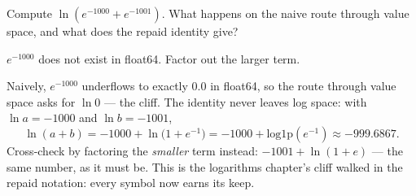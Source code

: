 \begin{problem}[stretch]
Compute $\ln(e^{-1000} + e^{-1001})$. What happens on the naive
route through value space, and what does the repaid identity give?
\begin{hint}
$e^{-1000}$ does not exist in float64. Factor out the larger term.
\end{hint}
\begin{solution}
Naively, $e^{-1000}$ underflows to exactly $0.0$ in float64, so the
route through value space asks for $\ln 0$ — the cliff. The identity
never leaves log space: with $\ln a = -1000$ and $\ln b = -1001$,
\[
  \ln(a+b) = -1000 + \ln\!\bigl(1 + e^{-1}\bigr)
  = -1000 + \mathrm{log1p}(e^{-1}) \approx -999.6867 .
\]
Cross-check by factoring the \emph{smaller} term instead:
$-1001 + \ln(1 + e)$ — the same number, as it must be. This is the
logarithms chapter's cliff walked in the repaid notation: every
symbol now earns its keep.
\end{solution}
\end{problem}
